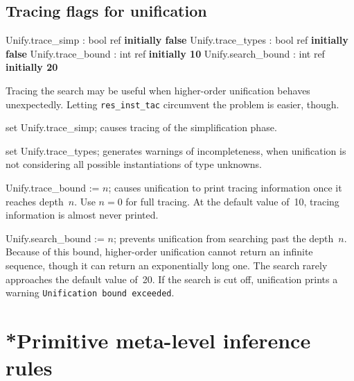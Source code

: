\subsection{Tracing flags for unification}
\begin{ttbox} 
Unify.trace_simp   : bool ref \hfill\textbf{initially false}
Unify.trace_types  : bool ref \hfill\textbf{initially false}
Unify.trace_bound  : int ref \hfill\textbf{initially 10}
Unify.search_bound : int ref \hfill\textbf{initially 20}
\end{ttbox}
Tracing the search may be useful when higher-order unification behaves
unexpectedly.  Letting {\tt res_inst_tac} circumvent the problem is easier,
though.
\begin{ttdescription}
\item[set Unify.trace_simp;] 
causes tracing of the simplification phase.

\item[set Unify.trace_types;] 
generates warnings of incompleteness, when unification is not considering
all possible instantiations of type unknowns.

\item[Unify.trace_bound := $n$;] 
causes unification to print tracing information once it reaches depth~$n$.
Use $n=0$ for full tracing.  At the default value of~10, tracing
information is almost never printed.

\item[Unify.search_bound := $n$;] prevents unification from
  searching past the depth~$n$.  Because of this bound, higher-order
  unification cannot return an infinite sequence, though it can return
  an exponentially long one.  The search rarely approaches the default value
  of~20.  If the search is cut off, unification prints a warning
  \texttt{Unification bound exceeded}.
\end{ttdescription}


\section{*Primitive meta-level inference rules}

